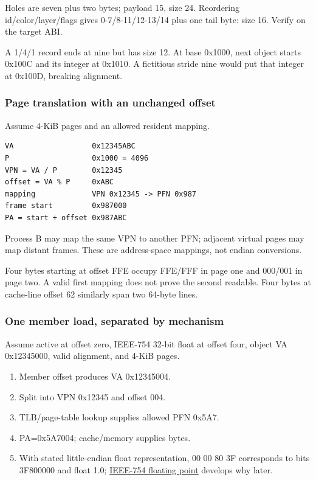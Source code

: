 Holes are seven plus two bytes; payload 15, size 24. Reordering id/color/layer/flags gives 0-7/8-11/12-13/14 plus one tail byte: size 16. Verify on the target ABI.

A 1/4/1 record ends at nine but has size 12. At base 0x1000, next object starts 0x100C and its integer at 0x1010. A fictitious stride nine would put that integer at 0x100D, breaking alignment.

\subsubsection{Page translation with an unchanged offset}\label{appendix-92ff77d4dfdc-page-translation-with-an-unchanged-offset}

\hypertarget{appendix-92ff77d4dfdc-page-translation-with-an-unchanged-offset}{}

Assume 4-KiB pages and an allowed resident mapping.

\begin{verbatim}
VA                  0x12345ABC
P                   0x1000 = 4096
VPN = VA / P        0x12345
offset = VA % P     0xABC
mapping             VPN 0x12345 -> PFN 0x987
frame start         0x987000
PA = start + offset 0x987ABC
\end{verbatim}

Process B may map the same VPN to another PFN; adjacent virtual pages may map distant frames. These are address-space mappings, not endian conversions.

Four bytes starting at offset FFE occupy FFE/FFF in page one and 000/001 in page two. A valid first mapping does not prove the second readable. Four bytes at cache-line offset 62 similarly span two 64-byte lines.

\subsubsection{One member load, separated by mechanism}\label{appendix-92ff77d4dfdc-one-member-load-separated-by-mechanism}

\hypertarget{appendix-92ff77d4dfdc-one-member-load-separated-by-mechanism}{}

Assume active at offset zero, IEEE-754 32-bit float at offset four, object VA 0x12345000, valid alignment, and 4-KiB pages.

\begin{enumerate}
\def\labelenumi{\arabic{enumi}.}
\tightlist
\item
  Member offset produces VA 0x12345004.
\item
  Split into VPN 0x12345 and offset 004.
\item
  TLB/page-table lookup supplies allowed PFN 0x5A7.
\item
  PA=0x5A7004; cache/memory supplies bytes.
\item
  With stated little-endian float representation, 00 00 80 3F corresponds to bits 3F800000 and float 1.0; \hyperref[appendix-343615f49ddf]{IEEE-754 floating point} develops why later.
\end{enumerate}

